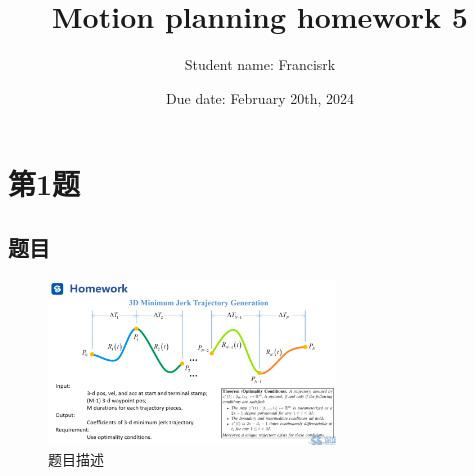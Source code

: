 \documentclass[40pt,a4paper,UTF8,twocolumn]{ctexart}%
\title{Motion planning homework 5}
\author{Student name: Francisrk}
\date{Due date: February 20th, 2024}
\numberwithin{equation}{section}
\begin{document}
	
\maketitle   %









\section{第1题}


\subsection{题目}

\begin{figure}[H]
    \centering
    \includegraphics[width=3.0in]{ch5_1.png} 
    \caption{题目描述}
    \label{fig1} %
\end{figure}
\end{document}
